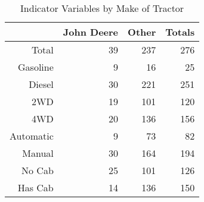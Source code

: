 \begin{table}[ht]
\centering
\begin{tabular}{rrrr}
  \hline
 & John Deere & Other & Totals \\ 
  \hline
Total & 39 & 237 & 276 \\ 
  Gasoline & 9 & 16 & 25 \\ 
  Diesel & 30 & 221 & 251 \\ 
  2WD & 19 & 101 & 120 \\ 
  4WD & 20 & 136 & 156 \\ 
  Automatic & 9 & 73 & 82 \\ 
  Manual & 30 & 164 & 194 \\ 
  No Cab & 25 & 101 & 126 \\ 
  Has Cab & 14 & 136 & 150 \\ 
   \hline
\end{tabular}
\caption{Indicator Variables by Make of Tractor} 
\label{tab:ind_by_make}
\end{table}
